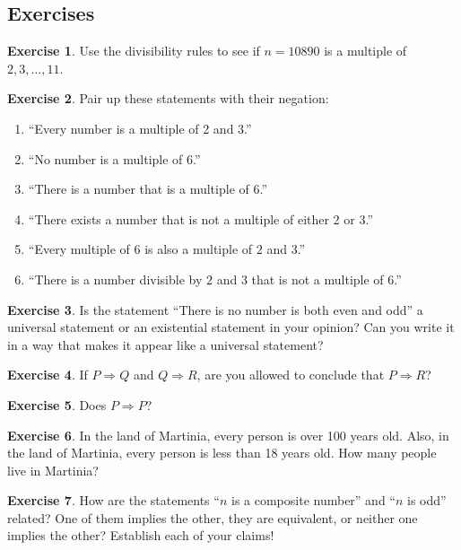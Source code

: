 \documentclass[11pt]{article}
\theoremstyle{definition}
\newtheorem{exercise}{Exercise}
\numberwithin{thm}{section}
\begin{document}
\subsection{Exercises}

\begin{exercise} Use the divisibility rules to see if $n= 10890$ is a multiple of $2,3, \ldots, 11$.
\end{exercise}

\begin{exercise} Pair up these statements with their negation:
\begin{enumerate}
	\item ``Every number is a multiple of 2 and 3.''
    \item ``No number is a multiple of 6.''
    \item ``There is a number that is a multiple of 6.''
    \item ``There exists a number that is not a multiple of either 2 or 3.''
    \item ``Every multiple of 6 is also a multiple of $2$ and $3$.''
    \item ``There is a number divisible by $2$ and $3$ that is not a multiple of $6$.''
\end{enumerate}
\end{exercise}

\begin{exercise} Is the statement ``There is no number is both even and odd'' a universal statement or an existential statement in your opinion? Can you write it in a way that makes it appear like a universal statement? 
\end{exercise}

\begin{exercise} If $P \Rightarrow Q$ and $Q \Rightarrow R$, are you allowed to conclude that $P \Rightarrow R$?
\end{exercise}

\begin{exercise} Does $P \Rightarrow P$?
\end{exercise}

\begin{exercise} In the land of Martinia, every person is over 100 years old. Also, in the land of Martinia, every person is less than 18 years old. How many people live in Martinia?
\end{exercise}

\begin{exercise} How are the statements ``$n$ is a composite number'' and ``$n$ is odd'' related? One of them implies the other, they are equivalent, or neither one implies the other? Establish each of your claims!
\end{exercise}
\end{document}
